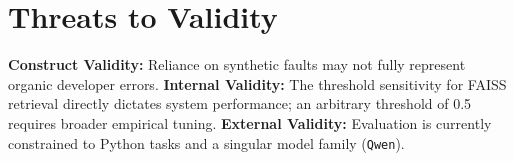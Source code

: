 \section{Threats to Validity}
\textbf{Construct Validity:} Reliance on synthetic faults may not fully represent organic developer errors. 
\textbf{Internal Validity:} The threshold sensitivity for FAISS retrieval directly dictates system performance; an arbitrary threshold of 0.5 requires broader empirical tuning.
\textbf{External Validity:} Evaluation is currently constrained to Python tasks and a singular model family (\texttt{Qwen}).
